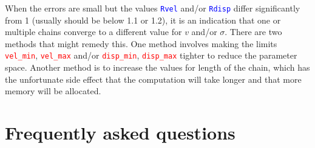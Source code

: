 \documentclass[usenatbib,usegraphicx,useAMS,onecolumn]{mn2e}
\newcommand{\codeline}[1]{\lstinline|#1|}
\newcommand{\paramdef}[1]{\textcolor{red}{\codeline{#1}}}
\newcommand{\tblcol}[1]{\textcolor{blue}{\codeline{#1}}}
\begin{document}
When the errors are small but the values \tblcol{Rvel} and/or \tblcol{Rdisp} differ significantly from 1 (usually should be below 1.1 or 1.2), it is an indication that one or multiple chains converge to a different value for $v$ and/or $\sigma$.
There are two methods that might remedy this.
One method involves making the limits \paramdef{vel_min}, \paramdef{vel_max} and/or \paramdef{disp_min}, \paramdef{disp_max} tighter to reduce the parameter space.
Another method is to increase the values for length of the chain, which has the unfortunate side effect that the computation will take longer and that more memory will be allocated.

\section{Frequently asked questions}
\end{document}

